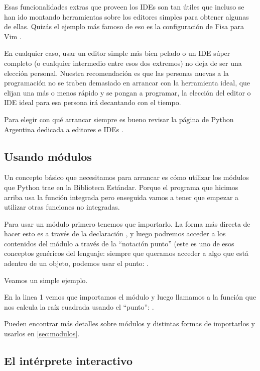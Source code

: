 Esas funcionalidades extras que proveen los IDEs son tan útiles que incluso se han ido montando herramientas sobre los editores simples para obtener algunas de ellas. Quizás el ejemplo más famoso de eso es la configuración de Fisa para Vim \cite{fisavim}.

En cualquier caso, usar un editor simple más bien pelado o un IDE súper completo (o cualquier intermedio entre esos dos extremos) no deja de ser una elección personal. Nuestra recomendación es que las personas nuevas a la programación no se traben demasiado en arrancar con la herramienta ideal, que elijan una más o menos rápido y se pongan a programar, la elección del editor o IDE ideal para esa persona irá decantando con el tiempo.

Para elegir con qué arrancar siempre es bueno revisar la página de Python Argentina dedicada a editores e IDEs \cite{pyar_ides}.


\subsection{Usando módulos}\label{sub:intromods}

Un concepto básico que necesitamos para arrancar es cómo utilizar los módulos que Python trae en la Biblioteca Estándar. Porque el programa que hicimos arriba usa la función integrada  pero enseguida vamos a tener que empezar a utilizar otras funciones no integradas.

Para usar un módulo primero tenemos que importarlo. La forma más directa de hacer esto es a través de la declaración , y luego podremos acceder a los contenidos del módulo a través de la ``notación punto'' (este es uno de esos conceptos genéricos del lenguaje: siempre que queramos acceder a algo que está adentro de un objeto, podemos usar el punto: .

Veamos un simple ejemplo. 


En la linea 1 vemos que importamos el módulo  y luego llamamos a la función que nos calcula la raíz cuadrada usando el ``punto'': .

Pueden encontrar más detalles sobre módulos y distintas formas de importarlos y usarlos en \ref{sec:modulos}.


\subsection{El intérprete interactivo}

